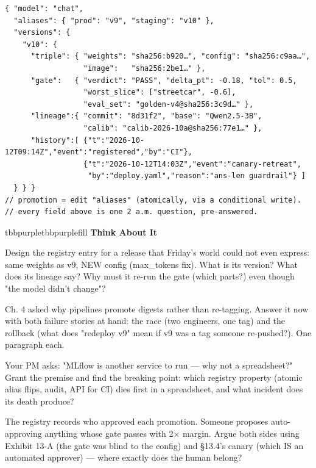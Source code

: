 \begin{terminalbox}
\begin{Verbatim}[breaklines=true,breakanywhere=true,fontsize=\small,formatcom=\color{tbbtermfg},codes=\tbbcodeactive]
{ "model": "chat",
  "aliases": { "prod": "v9", "staging": "v10" },
  "versions": {
    "v10": {
      "triple": { "weights": "sha256:b920…", "config": "sha256:c9aa…",
                  "image":   "sha256:2be1…" },
      "gate":   { "verdict": "PASS", "delta_pt": -0.18, "tol": 0.5,
                  "worst_slice": ["streetcar", -0.6],
                  "eval_set": "golden-v4@sha256:3c9d…" },
      "lineage":{ "commit": "8d31f2", "base": "Qwen2.5-3B",
                  "calib": "calib-2026-10a@sha256:77e1…" },
      "history":[ {"t":"2026-10-12T09:14Z","event":"registered","by":"CI"},
                  {"t":"2026-10-12T14:03Z","event":"canary-retreat",
                   "by":"deploy.yaml","reason":"ans-len guardrail"} ]
  } } }
// promotion = edit "aliases" (atomically, via a conditional write).
// every field above is one 2 a.m. question, pre-answered.
\end{Verbatim}
\end{terminalbox}

\begin{calloutbox}{tbbpurple}{tbbpurplefill}
{\normalsize\bfseries\color{tbbpurple}Think About It}\par\vspace{3pt}
\begin{tbbitemize}
  \item Design the registry entry for a release that Friday's world could not even express: same weights as v9, NEW config (max\_tokens fix). What is its version? What does its lineage say? Why must it re-run the gate (which parts?) even though "the model didn't change"?
  \item Ch. 4 asked why pipelines promote digests rather than re-tagging. Answer it now with both failure stories at hand: the race (two engineers, one tag) and the rollback (what does "redeploy v9" mean if v9 was a tag someone re-pushed?). One paragraph each.
  \item Your PM asks: "MLflow is another service to run — why not a spreadsheet?" Grant the premise and find the breaking point: which registry property (atomic alias flips, audit, API for CI) dies first in a spreadsheet, and what incident does its death produce?
  \item The registry records who approved each promotion. Someone proposes auto-approving anything whose gate passes with 2× margin. Argue both sides using Exhibit 13-A (the gate was blind to the config) and §13.4's canary (which IS an automated approver) — where exactly does the human belong?
\end{tbbitemize}
\end{calloutbox}

